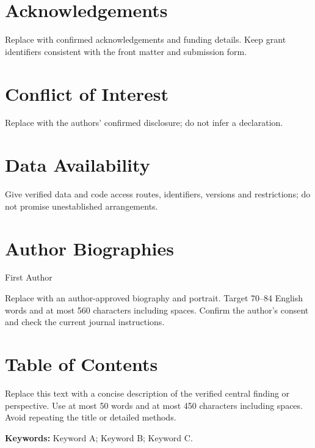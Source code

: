 \documentclass[serif,twocolumn]{prism-wiley-article}
\begin{document}
\section*{Acknowledgements}
Replace with confirmed acknowledgements and funding details. Keep grant
identifiers consistent with the front matter and submission form.

\section*{Conflict of Interest}
Replace with the authors' confirmed disclosure; do not infer a declaration.

\section*{Data Availability}
Give verified data and code access routes, identifiers, versions and
restrictions; do not promise unestablished arrangements.




\noindent\begin{minipage}{\linewidth}
\section*{Author Biographies}
\begin{biography}{First Author}
\par\smallskip
Replace with an author-approved biography and portrait. Target 70--84 English
words and at most 560 characters including spaces. Confirm the author's
consent and check the current journal instructions.
\end{biography}
\end{minipage}

\clearpage
\onecolumn
\section*{Table of Contents}
\begin{center}
\begingroup
\setlength{\fboxsep}{0pt}
\endgroup
\end{center}
Replace this text with a concise description of the verified central
finding or perspective. Use at most 50 words and at most 450 characters
including spaces. Avoid repeating the title or detailed methods.

\medskip
\noindent\textbf{Keywords:} Keyword A; Keyword B; Keyword C.
\end{document}
